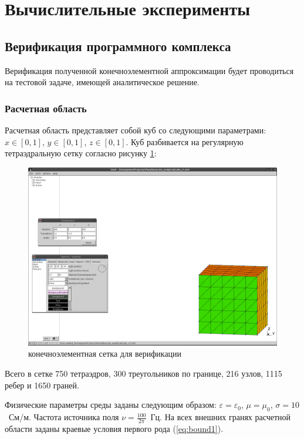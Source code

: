 \documentclass[a4paper,12pt]{article}
\makeatletter
\newcommand{\labelname}[1]{%
	\def\@currentlabelname{#1}}%
\makeatother
\begin{document}

\clearpage
\section{Вычислительные эксперименты}
\labelname{3}\label{sec:numerical_experiments}
\subsection{Верификация программного комплекса}
Верификация полученной конечноэлементной аппроксимации будет проводиться на тестовой задаче, имеющей аналитическое решение.
\subsubsection{Расчетная область}
Расчетная область представляет собой куб со следующими параметрами: $x \in [0,1]$, $y \in [0,1]$, $z \in [0,1]$. Куб разбивается на регулярную тетраэдральную сетку согласно рисунку \ref{fig:verify:x1}:

\begin{figure}[!htbp]
	\centering
	\includegraphics[trim=387mm 20mm 5mm 220mm,clip,scale=0.4]{verify/x1.png}
	\caption{конечноэлементная сетка для верификации}
	\label{fig:verify:x1}
\end{figure}

\noindent Всего в сетке 750 тетраэдров, 300 треугольников по границе, 216 узлов, 1115 ребер и 1650 граней.

Физические параметры среды заданы следующим образом: $\varepsilon = \varepsilon_0$, $\mu = \mu_0$, $\sigma = 10$~См/м. Частота источника поля $\nu = \frac{100}{2 \pi}$~Гц. На всех внешних гранях расчетной области заданы краевые условия первого рода (\ref{eq:bound1}).
\end{document}
